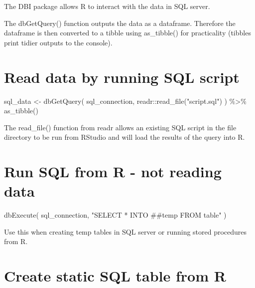 \documentclass[
]{book}
\newenvironment{Shaded}{\begin{snugshade}}{\end{snugshade}}
\newcommand{\FunctionTok}[1]{\textcolor[rgb]{0.00,0.00,0.00}{#1}}
\newcommand{\NormalTok}[1]{#1}
\newcommand{\OtherTok}[1]{\textcolor[rgb]{0.56,0.35,0.01}{#1}}
\newcommand{\SpecialCharTok}[1]{\textcolor[rgb]{0.00,0.00,0.00}{#1}}
\newcommand{\StringTok}[1]{\textcolor[rgb]{0.31,0.60,0.02}{#1}}
\begin{document}
The DBI package allows R to interact with the data in SQL server.

The dbGetQuery() function outputs the data as a dataframe. Therefore the dataframe is then converted to a tibble using as\_tibble() for practicality (tibbles print tidier outputs to the console).

\hypertarget{read-data-by-running-sql-script}{%
\section{Read data by running SQL script}\label{read-data-by-running-sql-script}}

\begin{Shaded}
\begin{Highlighting}[]
\NormalTok{sql\_data }\OtherTok{\textless{}{-}} 
  \FunctionTok{dbGetQuery}\NormalTok{(}
\NormalTok{    sql\_connection,}
\NormalTok{    readr}\SpecialCharTok{::}\FunctionTok{read\_file}\NormalTok{(}\StringTok{"script.sql"}\NormalTok{)}
\NormalTok{  ) }\SpecialCharTok{\%\textgreater{}\%} \FunctionTok{as\_tibble}\NormalTok{()}
\end{Highlighting}
\end{Shaded}

The read\_file() function from readr allows an existing SQL script in the file directory to be run from RStudio and will load the results of the query into R.

\hypertarget{run-sql-from-r---not-reading-data}{%
\section{Run SQL from R - not reading data}\label{run-sql-from-r---not-reading-data}}

\begin{Shaded}
\begin{Highlighting}[]
\FunctionTok{dbExecute}\NormalTok{(}
\NormalTok{  sql\_connection,}
  \StringTok{"SELECT *}
\StringTok{  INTO \#\#temp}
\StringTok{  FROM table"}
\NormalTok{)}
\end{Highlighting}
\end{Shaded}

Use this when creating temp tables in SQL server or running stored procedures from R.

\hypertarget{create-static-sql-table-from-r}{%
\section{Create static SQL table from R}\label{create-static-sql-table-from-r}}
\end{document}
